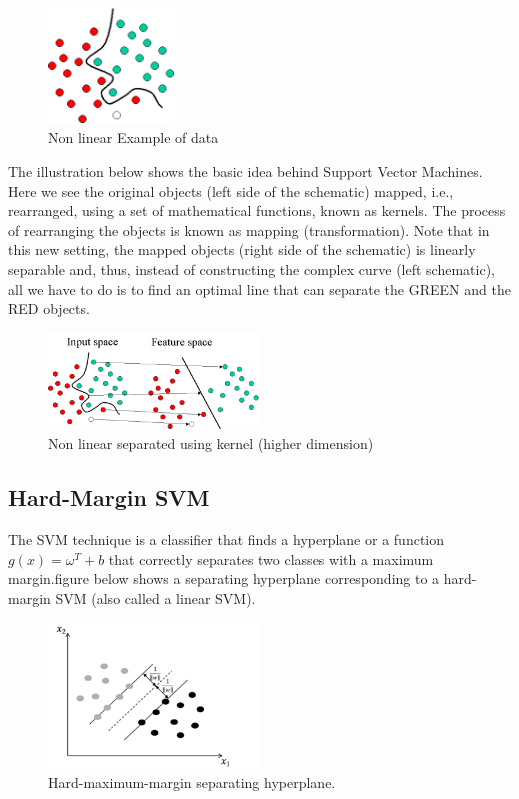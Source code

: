 \begin{figure}[H]
\centering
\includegraphics[width=0.3\textwidth]{img/svm2.png}
\caption{Non linear Example of data  }
\label{123 }
\end{figure}

The illustration below shows the basic idea behind Support Vector Machines. Here we see the original objects (left side of the schematic) mapped, i.e., rearranged, using a set of mathematical functions, known as kernels. The process of rearranging the objects is known as mapping (transformation). Note that in this new setting, the mapped objects (right side of the schematic) is linearly separable and, thus, instead of constructing the complex curve (left schematic), all we have to do is to find an optimal line that can separate the GREEN and the RED objects.

\begin{figure}[H]
\centering
\includegraphics[width=0.5\textwidth]{img/SVMIntro3.png}
\caption{Non linear separated using kernel (higher dimension) }
\label{124 }
\end{figure}


\subsection{Hard-Margin SVM}
The SVM technique is a classifier that finds a hyperplane or a function $g(x) = {\omega}^T +  b$   that correctly separates two classes with a maximum margin.figure below shows a separating hyperplane corresponding to a hard-margin SVM (also called a linear SVM).

\begin{figure}[H]
\centering
\includegraphics[width=0.5\textwidth]{img/hardmargin.PNG}
\caption{ Hard-maximum-margin separating hyperplane. }
\label{125 }
\end{figure}


